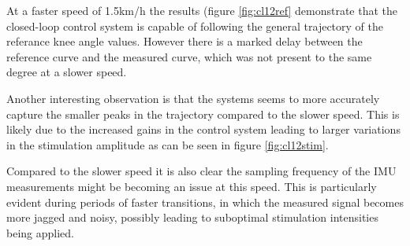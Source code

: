 
At a faster speed of 1.5km/h the results (figure \ref{fig:cl12ref} demonstrate that the closed-loop control system is capable of following the general trajectory of the referance knee angle values. However there is a marked delay between the reference curve and the measured curve, which was not present to the same degree at a slower speed.

Another interesting observation is that the systems seems to more accurately capture the smaller peaks in the trajectory compared to the slower speed. This is likely due to the increased gains in the control system leading to larger variations in the stimulation amplitude as can be seen in figure \ref{fig:cl12stim}.

Compared to the slower speed it is also clear the sampling frequency of the IMU measurements might be becoming an issue at this speed. This is particularly evident during periods of faster transitions, in which the measured signal becomes more jagged and noisy, possibly leading to suboptimal stimulation intensities being applied. 



